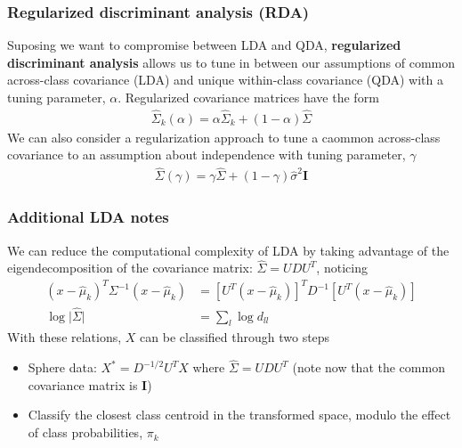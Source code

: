 \documentclass{article}
\newcommand{\abs}[1]{\lvert#1\rvert}
\begin{document}
\subsubsection{Regularized discriminant analysis (RDA)}
Suposing we want to compromise between LDA and QDA, \textbf{regularized discriminant analysis} allows us to tune in between our assumptions of common across-class covariance (LDA) and unique within-class covariance (QDA) with a tuning parameter, $\alpha$. Regularized covariance matrices have the form
\begin{align*}
  \hat{\Sigma}_k(\alpha) = \alpha\hat{\Sigma}_k + (1 - \alpha)\hat{\Sigma}
\end{align*}
We can also consider a regularization approach to tune a caommon across-class covariance to an assumption about independence with tuning parameter, $\gamma$
\begin{align*}
  \hat{\Sigma}(\gamma) = \gamma\hat{\Sigma} + (1 - \gamma)\hat{\sigma}^2\mathbf{I} 
\end{align*}

\subsubsection{Additional LDA notes}
We can reduce the computational complexity of LDA by taking advantage of the eigendecomposition of the covariance matrix: $\hat{\Sigma} = UDU^T$, noticing
\begin{align*}
  (x - \hat{\mu}_k)^T \Sigma^{-1}(x - \hat{\mu}_k) &= [U^T(x - \hat{\mu}_k)]^T D^{-1}[U^T(x - \hat{\mu}_k)]\\
  \log\abs{\hat{\Sigma}} &= \sum_l\log d_{ll}
\end{align*}
With these relations, $X$ can be classified through two steps
\begin{itemize}
  \item Sphere data: $X^* = D^{-1/2}U^TX$ where $\hat{\Sigma} = UDU^T$ (note now that the common covariance matrix is $\mathbf{I}$)
  \item Classify the closest class centroid in the transformed space, modulo the effect of class probabilities, $\pi_k$
\end{itemize}
\end{document}
